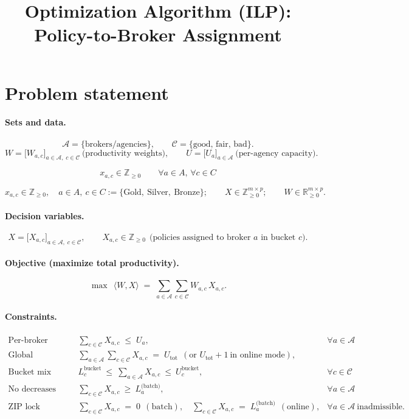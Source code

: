 \documentclass[11pt]{article}
\title{Optimization Algorithm (ILP): Policy-to-Broker Assignment}
\author{}
\date{}
\newcommand{\A}{\mathcal{A}}                 %
\newcommand{\C}{\mathcal{C}}                 %
\newcommand{\Z}{\mathbb{Z}}
\begin{document}
\maketitle

\section{Problem statement}

\paragraph{Sets and data.}
\[
\A=\{\text{brokers/agencies}\},\qquad
\C=\{\text{good},\,\text{fair},\,\text{bad}\}.
\]
\[
W=\big[W_{a,c}\big]_{a\in\A,\;c\in\C}\ \text{(productivity weights)},\qquad
U=\big[U_a\big]_{a\in\A}\ \text{(per-agency capacity)}.
\]

\[
x_{a,c} \in \mathbb{Z}_{\ge 0} \qquad \forall a \in A,\, \forall c \in C
\]


\[
x_{a,c} \in \mathbb{Z}_{\ge 0},\quad a\in A,\ c\in C := \{\text{Gold},\ \text{Silver},\ \text{Bronze}\};\qquad
X \in \mathbb{Z}_{\ge 0}^{m\times p};\qquad
W \in \mathbb{R}_{\ge 0}^{m\times p}.
\]


\paragraph{Decision variables.}
\[
X=\big[X_{a,c}\big]_{a\in\A,\;c\in\C},\qquad
X_{a,c}\in \Z_{\ge 0}\ \ \text{(policies assigned to broker $a$ in bucket $c$)}.
\]

\paragraph{Objective (maximize total productivity).}
\begin{equation*}
\max\ \ \langle W,X\rangle
\;=\;
\sum_{a\in\A}\sum_{c\in\C} W_{a,c}\,X_{a,c}.
\end{equation*}

\paragraph{Constraints.}
\begin{align*}
\text{Per-broker capacity:}\quad
& \sum_{c\in\C} X_{a,c} \;\le\; U_a,
& \forall a\in\A
\\[4pt]
\text{Global conservation:}\quad
& \sum_{a\in\A}\sum_{c\in\C} X_{a,c} \;=\; U_{\mathrm{tot}}
\ \ (\text{or }U_{\mathrm{tot}}+1\ \text{in online mode}),
\\[4pt]
\text{Bucket mix (optional):}\quad
& L^{\text{bucket}}_c \ \le\ \sum_{a\in\A} X_{a,c}\ \le\ U^{\text{bucket}}_c,
& \forall c\in\C
\\[4pt]
\text{No decreases (online):}\quad
& \sum_{c\in\C} X_{a,c} \ \ge\ L^{\text{(batch)}}_a,
& \forall a\in\A
\\[4pt]
\text{ZIP lock (inadmissible):}\quad
& \sum_{c\in\C} X_{a,c} \;=\; 0\ \ (\text{batch}),\quad
\sum_{c\in\C} X_{a,c} \;=\; L^{\text{(batch)}}_a\ \ (\text{online}),
& \forall a\in\A\ \text{inadmissible.}
\end{align*}
\end{document}
